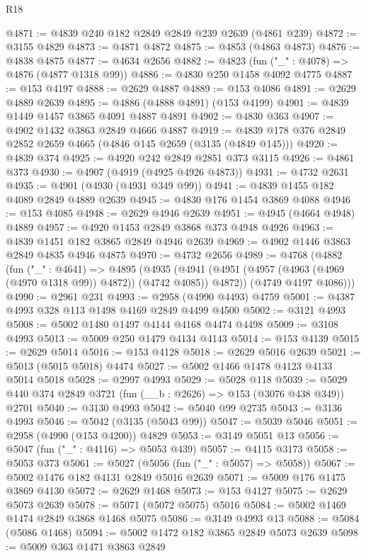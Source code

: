 \begin{lexlean}{R18}
\begin{coremodule}
@4871 := @4839 @240 @182 @2849 @2849 @239 @2639 (@4861 @239)
@4872 := @3155 @4829
@4873 := @4871 @4872
@4875 := @4853 (@4863 @4873)
@4876 := @4838 @4875
@4877 := @4634 @2656
@4882 := @4823 (fun ("_" : @4078) => @4876 (@4877 @1318 @99))
@4886 := @4830 @250 @1458 @4092 @4775
@4887 := @153 @4197
@4888 := @2629 @4887
@4889 := @153 @4086
@4891 := @2629 @4889 @2639
@4895 := @4886 (@4888 @4891) (@153 @4199)
@4901 := @4839 @1449 @1457 @3865 @4091 @4887 @4891
@4902 := @4830 @363
@4907 := @4902 @1432 @3863 @2849 @4666 @4887
@4919 := @4839 @178 @376 @2849 @2852 @2659 @4665 (@4846 @145 @2659 (@3135 (@4849 @145)))
@4920 := @4839 @374
@4925 := @4920 @242 @2849 @2851 @373 @3115
@4926 := @4861 @373
@4930 := @4907 (@4919 (@4925 @4926 @4873))
@4931 := @4732 @2631
@4935 := @4901 (@4930 (@4931 @349 @99))
@4941 := @4839 @1455 @182 @4089 @2849 @4889 @2639
@4945 := @4830 @176 @1454 @3869 @4088
@4946 := @153 @4085
@4948 := @2629 @4946 @2639
@4951 := @4945 (@4664 @4948) @4889
@4957 := @4920 @1453 @2849 @3868 @373 @4948 @4926
@4963 := @4839 @1451 @182 @3865 @2849 @4946 @2639
@4969 := @4902 @1446 @3863 @2849 @4835 @4946 @4875
@4970 := @4732 @2656
@4989 := @4768
    (@4882
      (fun ("_" : @4641) =>
      @4895
        (@4935 (@4941 (@4951 (@4957 (@4963 (@4969 (@4970 @1318 @99)) @4872)) (@4742 @4085)) @4872))
        (@4749 @4197 @4086)))
@4990 := @2961 @231
@4993 := @2958 (@4990 @4493) @4759
@5001 := @4387 @4993 @328 @113 @1498 @4169 @2849 @4499 @4500
@5002 := @3121 @4993
@5008 := @5002 @1480 @1497 @4144 @4168 @4474 @4498
@5009 := @3108 @4993
@5013 := @5009 @250 @1479 @4134 @4143
@5014 := @153 @4139
@5015 := @2629 @5014
@5016 := @153 @4128
@5018 := @2629 @5016 @2639
@5021 := @5013 (@5015 @5018) @4474
@5027 := @5002 @1466 @1478 @4123 @4133 @5014 @5018
@5028 := @2997 @4993
@5029 := @5028 @118
@5039 := @5029 @440 @374 @2849 @3721 (fun (__b : @2626) => @153 (@3076 @438 @349)) @2701
@5040 := @3130 @4993
@5042 := @5040 @99 @2735
@5043 := @3136 @4993
@5046 := @5042 (@3135 (@5043 @99))
@5047 := @5039 @5046
@5051 := @2958 (@4990 (@153 @4200)) @4829
@5053 := @3149 @5051 @13
@5056 := @5047 (fun ("_" : @4116) => @5053 @439)
@5057 := @4115 @3173
@5058 := @5053 @373
@5061 := @5027 (@5056 (fun ("_" : @5057) => @5058))
@5067 := @5002 @1476 @182 @4131 @2849 @5016 @2639
@5071 := @5009 @176 @1475 @3869 @4130
@5072 := @2629 @1468
@5073 := @153 @4127
@5075 := @2629 @5073 @2639
@5078 := @5071 (@5072 @5075) @5016
@5084 := @5002 @1469 @1474 @2849 @3868 @1468 @5075
@5086 := @3149 @4993 @13
@5088 := @5084 (@5086 @1468)
@5094 := @5002 @1472 @182 @3865 @2849 @5073 @2639
@5098 := @5009 @363 @1471 @3863 @2849

\end{coremodule}
\end{lexlean}
